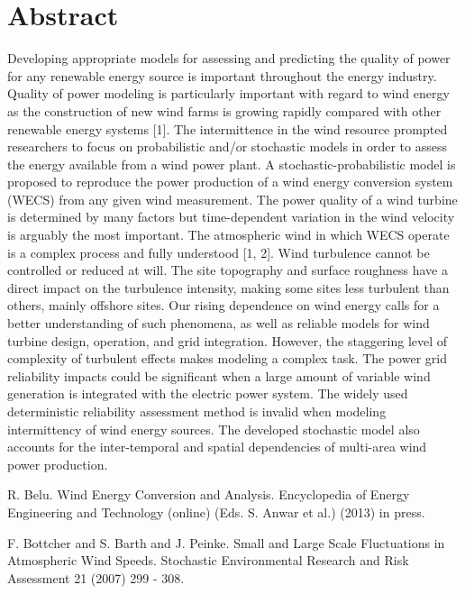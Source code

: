 \documentclass[article, A4, 11pt]{llncs}%
\begin{document}
\section*{Abstract}
Developing appropriate models for assessing and predicting the quality of power for any renewable energy source is important throughout the energy industry. Quality of power modeling is particularly important with regard to wind energy as the construction of new wind farms is growing rapidly compared with other renewable energy systems [1]. The intermittence in the wind resource prompted researchers to focus on probabilistic and/or stochastic models in order to assess the energy available from a wind power plant. A stochastic-probabilistic model is proposed to reproduce the power production of a wind energy conversion system (WECS) from any given wind measurement. The power quality of a wind turbine is determined by many factors but time-dependent variation in the wind velocity is arguably the most important. The atmospheric wind in which WECS operate is a complex process and fully understood [1, 2]. Wind turbulence cannot be controlled or reduced at will. The site topography and surface roughness have a direct impact on the turbulence intensity, making some sites less turbulent than others, mainly offshore sites. Our rising dependence on wind energy calls for a better understanding of such phenomena, as well as reliable models for wind turbine design, operation, and grid integration. However, the staggering level of complexity of turbulent effects makes modeling a complex task. The power grid reliability impacts could be significant when a large amount of variable wind generation is integrated with the electric power system. The widely used deterministic reliability assessment method is invalid when modeling intermittency of wind energy sources. The developed stochastic model also accounts for the inter-temporal and spatial dependencies of multi-area wind power production.


\begin{thebibliography}{10}
{\sc R. Belu}. {Wind Energy Conversion and Analysis}. Encyclopedia of Energy Engineering and Technology (online) (Eds. S. Anwar et al.) (2013) in press.

{\sc F. Bottcher and S. Barth and J. Peinke}. {Small and Large Scale Fluctuations in Atmospheric Wind Speeds}. Stochastic Environmental Research and Risk Assessment 21 (2007) 299 - 308.
\end{thebibliography} %
\end{document}
